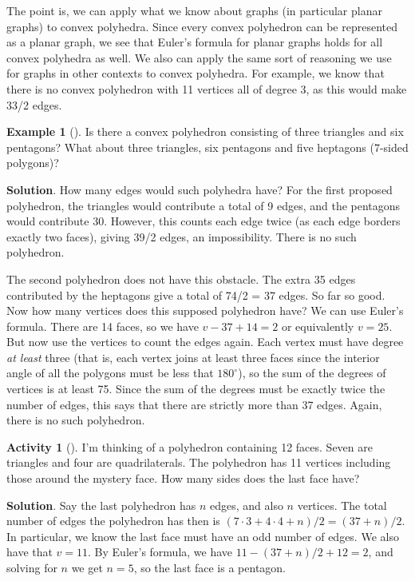 \documentclass[10pt,]{book}
\theoremstyle{plain}
\theoremstyle{definition}
\theoremstyle{definition}
\newtheorem{example}[theorem]{Example}
\theoremstyle{definition}
\newtheorem{activity}[project]{Activity}
\numberwithin{equation}{chapter}
\begin{document}
\par
\hypertarget{p-303}{}%
The point is, we can apply what we know about graphs (in particular planar graphs) to convex polyhedra. Since every convex polyhedron can be represented as a planar graph, we see that Euler's formula for planar graphs holds for all convex polyhedra as well. We also can apply the same sort of reasoning we use for graphs in other contexts to convex polyhedra. For example, we know that there is no convex polyhedron with 11 vertices all of degree 3, as this would make 33/2 edges.%
\begin{example}[]\label{example-8}
\hypertarget{p-304}{}%
Is there a convex polyhedron consisting of three triangles and six pentagons? What about three triangles, six pentagons and five heptagons (7-sided polygons)?%
\par\smallskip%
\noindent\textbf{Solution}.\hypertarget{solution-16}{}\quad%
\hypertarget{p-305}{}%
How many edges would such polyhedra have? For the first proposed polyhedron, the triangles would contribute a total of 9 edges, and the pentagons would contribute 30. However, this counts each edge twice (as each edge borders exactly two faces), giving 39/2 edges, an impossibility. There is no such polyhedron.%
\par
\hypertarget{p-306}{}%
The second polyhedron does not have this obstacle. The extra 35 edges contributed by the heptagons give a total of 74/2 = 37 edges. So far so good. Now how many vertices does this supposed polyhedron have? We can use Euler's formula. There are 14 faces, so we have \(v - 37 + 14 = 2\) or equivalently \(v = 25\). But now use the vertices to count the edges again. Each vertex must have degree \emph{at least} three (that is, each vertex joins at least three faces since the interior angle of all the polygons must be less that \(180^\circ\)), so the sum of the degrees of vertices is at least 75. Since the sum of the degrees must be exactly twice the number of edges, this says that there are strictly more than 37 edges. Again, there is no such polyhedron.%
\end{example}
\begin{activity}[]\label{activity-28}
\hypertarget{p-307}{}%
I'm thinking of a polyhedron containing 12 faces. Seven are triangles and four are quadrilaterals. The polyhedron has 11 vertices including those around the mystery face. How many sides does the last face have?%
\par\smallskip%
\noindent\textbf{Solution}.\hypertarget{solution-17}{}\quad%
\hypertarget{p-308}{}%
Say the last polyhedron has \(n\) edges, and also \(n\) vertices. The total number of edges the polyhedron has then is \((7 \cdot 3 + 4 \cdot 4 + n)/2 = (37 + n)/2\). In particular, we know the last face must have an odd number of edges. We also have that \(v = 11 \).  By Euler's formula, we have \(11 - (37+n)/2 + 12 = 2\), and solving for \(n\) we get \(n = 5\), so the last face is a pentagon.%
\end{activity}
\end{document}
